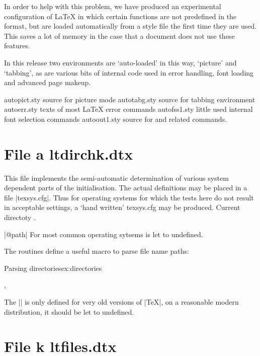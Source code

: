In order to help with this problem, we have produced an experimental configuration of LaTeX in which certain functions are not predefined in the format, but are loaded automatically from a style file the first time they are used. This saves a lot of memory in the case that a document does not use these features.

In this release two environments are ‘auto-loaded’ in this way, ‘picture’ and ‘tabbing’, as are various bits of internal code used in error handling, font loading and advanced page makeup.

  autopict.sty      source for picture mode
  autotabg.sty      source for tabbing environment
  autoerr.sty       texts of most LaTeX error commands
  autofss1.sty      little used internal font selection commands
  autoout1.sty      source for  and related commands.

\makeatletter

\section{File a ltdirchk.dtx}

This file implements the semi-automatic determination of various system dependent
parts of the initialisation. The actual definitions may be placed in a file
|texsys.cfg|. Thus for operating systems for which the tests here do not result in
acceptable settings, a `hand written' texsys.cfg may be produced.
Current directoty .


|@path| For most common operating sytsems is let to undefined. %

The routines define a useful macro to parse file name paths:

\begin{texexample}{Parsing directories}{ex:directories}

\filename@area

\filename@base,

\filename@ext

\end{texexample}

The |\@TeXversion| is only defined for very old versions of |TeX|, on a reasonable modern distribution, it should be let to undefined.



\section{File k ltfiles.dtx}


